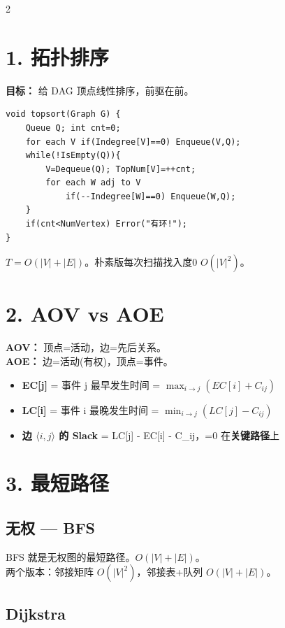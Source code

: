\documentclass[10pt,a4paper]{article}
\begin{document}
\begin{multicols}{2}

\section*{1. 拓扑排序}

\textbf{目标：} 给 DAG 顶点线性排序，前驱在前。

\begin{lstlisting}
void topsort(Graph G) {
    Queue Q; int cnt=0;
    for each V if(Indegree[V]==0) Enqueue(V,Q);
    while(!IsEmpty(Q)){
        V=Dequeue(Q); TopNum[V]=++cnt;
        for each W adj to V
            if(--Indegree[W]==0) Enqueue(W,Q);
    }
    if(cnt<NumVertex) Error("有环!");
}
\end{lstlisting}

$T=O(|V|+|E|)$。朴素版每次扫描找入度0 $O(|V|^2)$。

\section*{2. AOV vs AOE}

\textbf{AOV：} 顶点=活动，边=先后关系。\\
\textbf{AOE：} 边=活动(有权)，顶点=事件。

\begin{itemize}
\item \textbf{EC[j]} = 事件 j 最早发生时间 = $\max_{i\to j}(EC[i]+C_{ij})$
\item \textbf{LC[i]} = 事件 i 最晚发生时间 = $\min_{i\to j}(LC[j]-C_{ij})$
\item \textbf{边 $\langle i,j\rangle$ 的 Slack} = LC[j] - EC[i] - C_{ij}，=0 在\textbf{关键路径}上
\end{itemize}

\section*{3. 最短路径}

\subsection*{无权 — BFS}

BFS 就是无权图的最短路径。$O(|V|+|E|)$。\\
两个版本：邻接矩阵 $O(|V|^2)$，邻接表+队列 $O(|V|+|E|)$。

\subsection*{Dijkstra}


\end{multicols}
\end{document}
